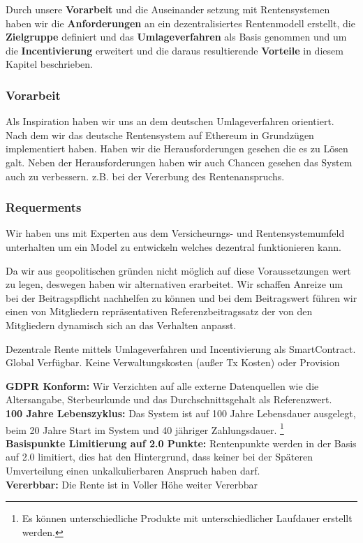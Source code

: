 Durch unsere \textbf{Vorarbeit} und die Auseinander setzung mit Rentensystemen haben wir die \textbf{Anforderungen} an ein dezentralisiertes Rentenmodell erstellt, die  \textbf{Zielgruppe} definiert und das \textbf{Umlageverfahren} als Basis genommen und um die \textbf{Incentivierung} erweitert und die daraus resultierende \textbf{Vorteile} in diesem Kapitel beschrieben.

\subsubsection*{Vorarbeit}

Als Inspiration haben wir uns an dem deutschen Umlageverfahren orientiert. Nach dem wir das deutsche Rentensystem auf Ethereum in Grundzügen implementiert haben. Haben wir die Herausforderungen gesehen die es zu Lösen galt.
Neben der Herausforderungen haben wir auch Chancen gesehen das System auch zu verbessern. z.B. bei der Vererbung des Rentenanspruchs.


\subsubsection*{Requerments}

Wir haben uns mit Experten aus dem Versicheurngs- und Rentensystemumfeld unterhalten um ein Model zu entwickeln welches dezentral funktionieren kann.

Da wir aus geopolitischen gründen nicht möglich auf diese Voraussetzungen wert zu legen, deswegen haben wir alternativen erarbeitet.
Wir schaffen Anreize um bei der Beitragspflicht nachhelfen zu können und bei dem Beitragswert führen wir einen von Mitgliedern repräsentativen Referenzbeitragssatz der von den Mitgliedern dynamisch sich an das Verhalten anpasst.

Dezentrale Rente mittels Umlageverfahren und Incentivierung als SmartContract.
Global Verfügbar. Keine Verwaltungskosten (außer Tx Kosten) oder Provision

\textbf{GDPR\cite{gdpr} Konform:} Wir Verzichten auf alle externe Datenquellen wie die Altersangabe, Sterbeurkunde und das Durchschnittsgehalt als Referenzwert.\\
\textbf{100 Jahre Lebenszyklus:} Das System ist auf 100 Jahre Lebensdauer ausgelegt, beim 20 Jahre Start im System und 40 jähriger Zahlungsdauer. \footnote{ Es können unterschiedliche Produkte mit unterschiedlicher Laufdauer erstellt werden.} \\
\textbf{Basispunkte Limitierung auf 2.0 Punkte:} Rentenpunkte werden in der Basis auf 2.0 limitiert, dies hat den Hintergrund, dass keiner bei der Späteren Umverteilung einen unkalkulierbaren Anspruch haben darf.\\
\textbf{Vererbbar:} Die Rente ist in Voller Höhe weiter Vererbbar


